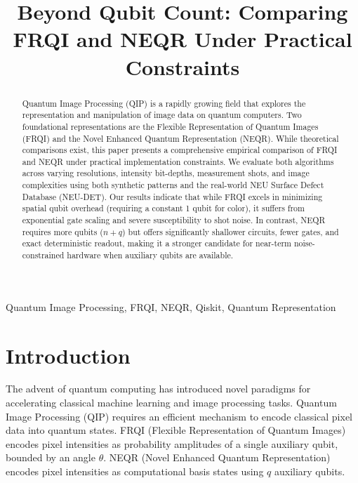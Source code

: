 \documentclass[conference]{IEEEtran}
\begin{document}
\title{Beyond Qubit Count: Comparing FRQI and NEQR Under Practical Constraints\\
}

\author{
}

\maketitle

\begin{abstract}
Quantum Image Processing (QIP) is a rapidly growing field that explores the representation and manipulation of image data on quantum computers. Two foundational representations are the Flexible Representation of Quantum Images (FRQI) and the Novel Enhanced Quantum Representation (NEQR). While theoretical comparisons exist, this paper presents a comprehensive empirical comparison of FRQI and NEQR under practical implementation constraints. We evaluate both algorithms across varying resolutions, intensity bit-depths, measurement shots, and image complexities using both synthetic patterns and the real-world NEU Surface Defect Database (NEU-DET). Our results indicate that while FRQI excels in minimizing spatial qubit overhead (requiring a constant 1 qubit for color), it suffers from exponential gate scaling and severe susceptibility to shot noise. In contrast, NEQR requires more qubits ($n+q$) but offers significantly shallower circuits, fewer gates, and exact deterministic readout, making it a stronger candidate for near-term noise-constrained hardware when auxiliary qubits are available.
\end{abstract}

\begin{IEEEkeywords}
Quantum Image Processing, FRQI, NEQR, Qiskit, Quantum Representation
\end{IEEEkeywords}

\section{Introduction}
The advent of quantum computing has introduced novel paradigms for accelerating classical machine learning and image processing tasks. Quantum Image Processing (QIP) requires an efficient mechanism to encode classical pixel data into quantum states. FRQI (Flexible Representation of Quantum Images) encodes pixel intensities as probability amplitudes of a single auxiliary qubit, bounded by an angle $\theta$. NEQR (Novel Enhanced Quantum Representation) encodes pixel intensities as computational basis states using $q$ auxiliary qubits.
\end{document}
